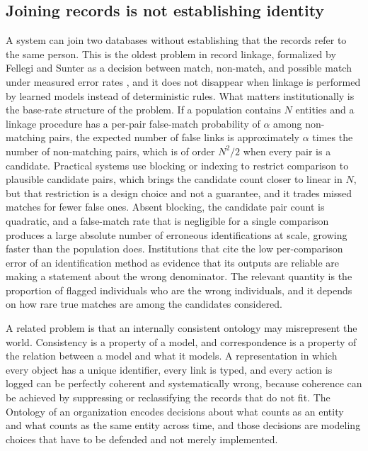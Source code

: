 \documentclass[11pt]{article}
\theoremstyle{plain}
\theoremstyle{definition}
\theoremstyle{remark}
\begin{document}
\subsection{Joining records is not establishing identity}

A system can join two databases without establishing that the records refer to the same person. This is the oldest problem in record linkage, formalized by Fellegi and Sunter as a decision between match, non-match, and possible match under measured error rates \cite{fellegi1969}, and it does not disappear when linkage is performed by learned models instead of deterministic rules. What matters institutionally is the base-rate structure of the problem. If a population contains $N$ entities and a linkage procedure has a per-pair false-match probability of $\alpha$ among non-matching pairs, the expected number of false links is approximately $\alpha$ times the number of non-matching pairs, which is of order $N^2/2$ when every pair is a candidate. Practical systems use blocking or indexing to restrict comparison to plausible candidate pairs, which brings the candidate count closer to linear in $N$, but that restriction is a design choice and not a guarantee, and it trades missed matches for fewer false ones. Absent blocking, the candidate pair count is quadratic, and a false-match rate that is negligible for a single comparison produces a large absolute number of erroneous identifications at scale, growing faster than the population does. Institutions that cite the low per-comparison error of an identification method as evidence that its outputs are reliable are making a statement about the wrong denominator. The relevant quantity is the proportion of flagged individuals who are the wrong individuals, and it depends on how rare true matches are among the candidates considered.

A related problem is that an internally consistent ontology may misrepresent the world. Consistency is a property of a model, and correspondence is a property of the relation between a model and what it models. A representation in which every object has a unique identifier, every link is typed, and every action is logged can be perfectly coherent and systematically wrong, because coherence can be achieved by suppressing or reclassifying the records that do not fit. The Ontology of an organization encodes decisions about what counts as an entity and what counts as the same entity across time, and those decisions are modeling choices that have to be defended and not merely implemented.
\end{document}
